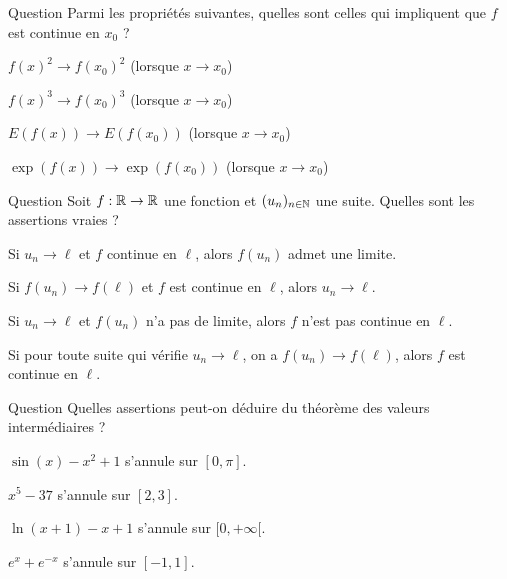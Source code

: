 \begin{multi}[multiple,feedback=
{Si \(f(x)^2 \to f(x_0)^2\)  alors ce n'est pas toujours vrai que \(f(x) \to f(x_0)\), prendre la fonction \(f(x)=-1\) si \(x<0\) et \(f(x)=+1\) sinon. Par contre avec le cube c'est vrai, car la fonction \(x \mapsto x^3\) est une bijection continue de \(\Rr\) dans \(\Rr\), idem avec l'exponentielle !
}]{Question}
Parmi les propriétés suivantes, quelles sont celles qui impliquent que \(f\) est continue en \(x_ 0\) ?

    \item \(f(x)^2 \to f(x_0)^2\) (lorsque \(x \to x_0\))
    \item* \(f(x)^3 \to f(x_0)^3\) (lorsque \(x \to x_0\))
    \item \(E(f(x)) \to E(f(x_0))\) (lorsque \(x \to x_0\))
    \item* \(\exp(f(x)) \to \exp(f(x_0))\) (lorsque \(x \to x_0\))
\end{multi}


\begin{multi}[multiple,feedback=
{Une fonction \(f\) est continue en \(\ell\) si et seulement si 
pour toute suite \((u_n)\) qui tend vers \(\ell\), on a \(f(u_n) \to f(\ell)\).
}]{Question}
Soit \(f : \mathbb{R} \to \mathbb{R}\) une fonction et \((u_n)_{n\in\mathbb{N}}\) une suite. Quelles sont les assertions vraies ?

    \item* Si \(u_n \to \ell\) et \(f\) continue en \(\ell\), alors \(f(u_n)\) admet une limite.
    \item Si \(f(u_n) \to f(\ell)\) et \(f\) est continue en \(\ell\), alors \(u_n \to \ell\).
    \item* Si \(u_n \to \ell\) et \(f(u_n)\) n'a pas de limite, alors \(f\) n'est pas continue en \(\ell\).
    \item* Si pour toute suite qui vérifie \(u_n \to \ell\), on a \(f(u_n) \to f(\ell)\), alors \(f\) est continue en \(\ell\).
\end{multi}


\begin{multi}[multiple,feedback=
{Pour montrer qu'une fonction continue \(f\) s'annule sur un intervalle \([a,b]\), il est suffisant de montrer que \(f(a)>0\) et \(f(b)<0\) (ou l'opposé).
}]{Question}
Quelles assertions peut-on déduire du théorème des valeurs intermédiaires ?

    \item* \(\sin(x) - x^2 + 1\) s'annule sur \([0,\pi]\).
    \item* \(x^5-37\) s'annule sur \([2,3]\).
    \item* \(\ln(x+1)-x+1\) s'annule sur \([0,+\infty[\).
    \item \(e^x+e^{-x}\) s'annule sur \([-1,1]\).
\end{multi}


